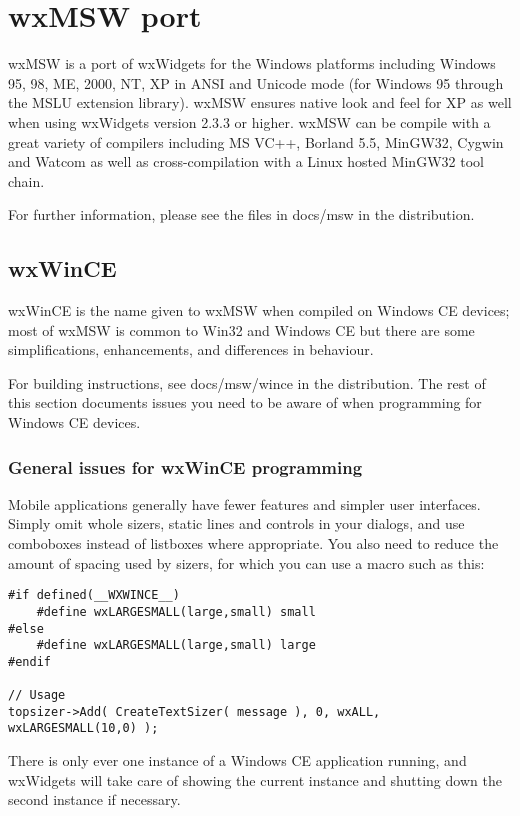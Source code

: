 \section{wxMSW port}\label{wxmswport}

wxMSW is a port of wxWidgets for the Windows platforms
including Windows 95, 98, ME, 2000, NT, XP in ANSI and
Unicode mode (for Windows 95 through the MSLU extension
library). wxMSW ensures native look and feel for XP
as well when using wxWidgets version 2.3.3 or higher.
wxMSW can be compile with a great variety of compilers
including MS VC++, Borland 5.5, MinGW32, Cygwin and
Watcom as well as cross-compilation with a Linux hosted
MinGW32 tool chain.

For further information, please see the files in docs/msw
in the distribution.

\subsection{wxWinCE}\label{wxwince}

wxWinCE is the name given to wxMSW when compiled on Windows CE devices;
most of wxMSW is common to Win32 and Windows CE but there are
some simplifications, enhancements, and differences in
behaviour.

For building instructions, see docs/msw/wince in the
distribution. The rest of this section documents issues you
need to be aware of when programming for Windows CE devices.

\subsubsection{General issues for wxWinCE programming}

Mobile applications generally have fewer features and
simpler user interfaces. Simply omit whole sizers, static
lines and controls in your dialogs, and use comboboxes instead
of listboxes where appropriate. You also need to reduce
the amount of spacing used by sizers, for which you can
use a macro such as this:

\begin{verbatim}
#if defined(__WXWINCE__)
    #define wxLARGESMALL(large,small) small
#else
    #define wxLARGESMALL(large,small) large
#endif

// Usage
topsizer->Add( CreateTextSizer( message ), 0, wxALL, wxLARGESMALL(10,0) );
\end{verbatim}

There is only ever one instance of a Windows CE application running,
and wxWidgets will take care of showing the current instance and
shutting down the second instance if necessary.

